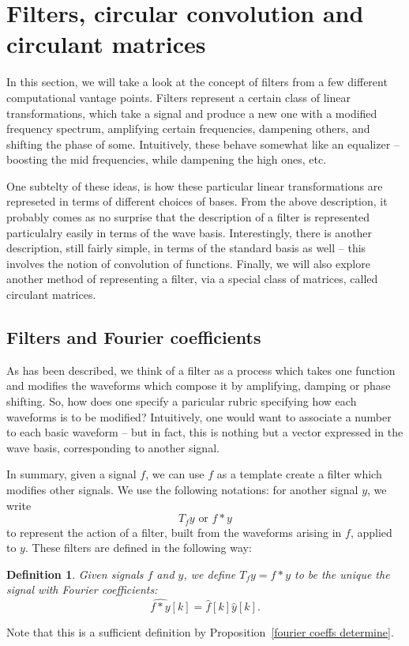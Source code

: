 \documentclass[12pt]{report}
\theoremstyle{plain}
\newtheorem{defn}[thm]{Definition}
\begin{document}
\section{Filters, circular convolution and circulant matrices}

In this section, we will take a look at the concept of filters from a few different computational vantage points. Filters represent a certain class of linear transformations, which take a signal and produce a new one with a modified frequency spectrum, amplifying certain frequencies, dampening others, and shifting the phase of some. Intuitively, these behave somewhat like an equalizer -- boosting the mid frequencies, while dampening the high ones, etc.

One subtelty of these ideas, is how these particular linear transformations are represeted in terms of different choices of bases. From the above description, it probably comes as no surprise that the description of a filter is represented particulalry easily in terms of the wave basis. Interestingly, there is another description, still fairly simple, in terms of the standard basis as well -- this involves the notion of convolution of functions. Finally, we will also explore another method of representing a filter, via a special class of matrices, called circulant matrices.

\subsection{Filters and Fourier coefficients}


As has been described, we think of a filter as a process which takes one function and modifies the waveforms which compose it by amplifying, damping or phase shifting. So, how does one specify a paricular rubric specifying how each waveforms is to be modified? Intuitively, one would want to associate a number to each basic waveform -- but in fact, this is nothing but a vector expressed in the wave basis, corresponding to another signal.

In summary, given a signal $f$, we can use $f$ as a template create a filter which modifies other signals. We use the following notations: for another signal $y$, we write
\[ T_f y  \text{ or } f * y \]
to represent the action of a filter, built from the waveforms arising in $f$, applied to $y$. These filters are defined in the following way:

\begin{defn} \label{filter def}
Given signals $f$ and $y$, we define $T_f y = f * y$ to be the unique the signal with Fourier coefficients:
\[ \widehat{f * y} [k] = \hat f[k] \hat y[k]. \]
\end{defn}
Note that this is a sufficient definition by Proposition~\ref{fourier coeffs determine}.
\end{document}
